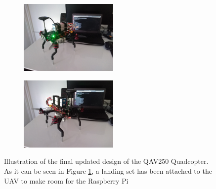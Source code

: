 \documentclass[../Head/report.tex]{subfiles}
\begin{document}
\begin{figure}[H]
    \centering
    \begin{subfigure}[b]{.33\textwidth}
        \centering
        \includegraphics[height=3.6cm]{../Figures/drone/drone_front.jpg}
        \caption{}
        \label{fig:drone_front}
    \end{subfigure}
    \begin{subfigure}[b]{.33\textwidth}
        \centering
        \includegraphics[height=3.6cm]{../Figures/drone/drone_front2.jpg}
        \caption{}
        \label{fig:drone_bottom_zoom}
    \end{subfigure}
    \caption{Illustration of the final updated design of the QAV250 Quadcopter. As it can be seen in Figure \ref{fig:drone_front}, a landing set has been attached to the UAV to make room for the Raspberry Pi}
    \label{fig:drone_one}
\end{figure}
\end{document}
